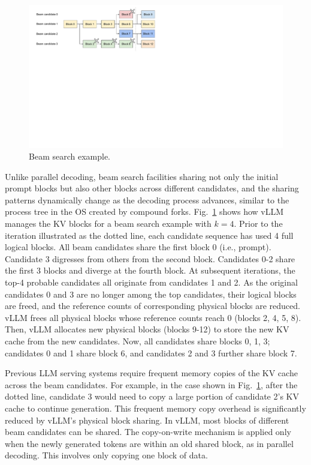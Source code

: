 \documentclass[sigplan,10pt]{acmart}
\newcommand{\sys}[0]{vLLM\xspace}
\begin{document}
\begin{figure}
    \centering
    \includegraphics[width=0.9\columnwidth]{figures/beam-search.pdf}
    \vspace{-10pt}
    \caption{Beam search example.}
    \label{fig:beam-search}
    \vspace{-10pt}
\end{figure}

Unlike parallel decoding, beam search facilities sharing not only the initial prompt blocks but also other blocks across different candidates, and the sharing patterns dynamically change as the decoding process advances, similar to the process tree in the OS created by compound forks. 
Fig.~\ref{fig:beam-search} shows how \sys manages the KV blocks for a beam search example with $k = 4$. Prior to the iteration illustrated as the dotted line, each candidate sequence has used 4 full logical blocks. All beam candidates share the first block 0 (i.e., prompt). Candidate 3 digresses from others from the second block. Candidates 0-2 share the first 3 blocks and diverge at the fourth block. At subsequent iterations, the top-4 probable candidates all originate from candidates 1 and 2. As the original candidates 0 and 3 are no longer among the top candidates, their logical blocks are freed, and the reference counts of corresponding physical blocks are reduced. \sys frees all physical blocks whose reference counts reach 0 (blocks 2, 4, 5, 8). Then, \sys allocates new physical blocks (blocks 9-12) to store the new KV cache from the new candidates. Now, all candidates share blocks 0, 1, 3; candidates 0 and 1 share block 6, and candidates 2 and 3 further share block 7.

Previous LLM serving systems require frequent memory copies of the KV cache across the beam candidates. For example, in the case shown in Fig.~\ref{fig:beam-search}, after the dotted line, candidate 3 would need to copy a large portion of candidate 2's KV cache to continue generation. This frequent memory copy overhead is significantly reduced by \sys's physical block sharing. In \sys, most blocks of different beam candidates can be shared. The copy-on-write mechanism is applied only when the newly generated tokens are within an old shared block, as in parallel decoding.  This involves only copying one block of data.
\end{document}
